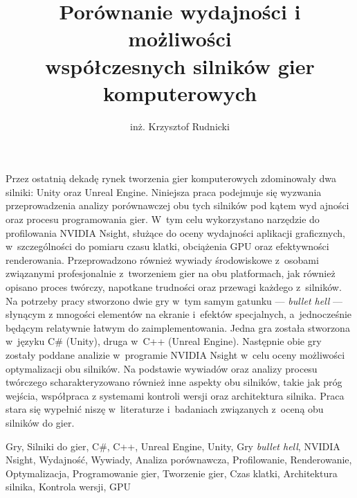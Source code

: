 \documentclass[
    bindingoffset=5mm,  %
    footnoteindent=3mm, %
    hyphenation=true    %
]{src/wut-thesis}
\begin{document}
\title{
    Porównanie wydajności i możliwości \\ współczesnych silników gier komputerowych
}

\author{inż. Krzysztof Rudnicki}
\date{\the\year}
\maketitle

\cleardoublepage %
\abstract 
Przez ostatnią dekadę rynek tworzenia gier komputerowych zdominowały dwa silniki: Unity oraz 
Unreal Engine. Niniejsza praca podejmuje się wyzwania przeprowadzenia analizy
porównawczej
obu tych silników pod kątem wyd ajności oraz procesu
programowania gier. W~tym celu wykorzystano 
narzędzie do
profilowania NVIDIA Nsight, służące do oceny wydajności aplikacji graficznych, 
w~szczególności do pomiaru czasu klatki, obciążenia GPU oraz
efektywności renderowania. 
Przeprowadzono również wywiady środowiskowe z~osobami związanymi profesjonalnie z~tworzeniem 
gier na obu platformach, jak również opisano proces twórczy, napotkane trudności oraz przewagi 
każdego z~silników. Na potrzeby pracy stworzono dwie gry w~tym samym gatunku --- 
\emph{bullet hell} --- słynącym z mnogości elementów na ekranie i~efektów specjalnych, 
a~jednocześnie będącym relatywnie łatwym do zaimplementowania. Jedna gra została stworzona 
w~języku C\# (Unity), druga w~C++ (Unreal Engine). Następnie obie gry zostały poddane analizie 
w~programie NVIDIA Nsight w~celu oceny możliwości optymalizacji obu silników. Na podstawie 
wywiadów oraz analizy procesu twórczego scharakteryzowano również inne aspekty obu silników, 
takie jak próg wejścia, współpraca z systemami kontroli wersji oraz architektura silnika. 
Praca stara się wypełnić niszę w~literaturze i~badaniach związanych z~oceną obu silników do gier.

\keywords Gry, Silniki do gier, C\#, C++, Unreal Engine, Unity, Gry \emph{bullet hell}, 
NVIDIA Nsight, Wydajność, Wywiady, Analiza porównawcza, Profilowanie, Renderowanie, 
Optymalizacja, Programowanie gier, Tworzenie gier, Czas klatki, Architektura silnika, 
Kontrola wersji, GPU
\end{document}
